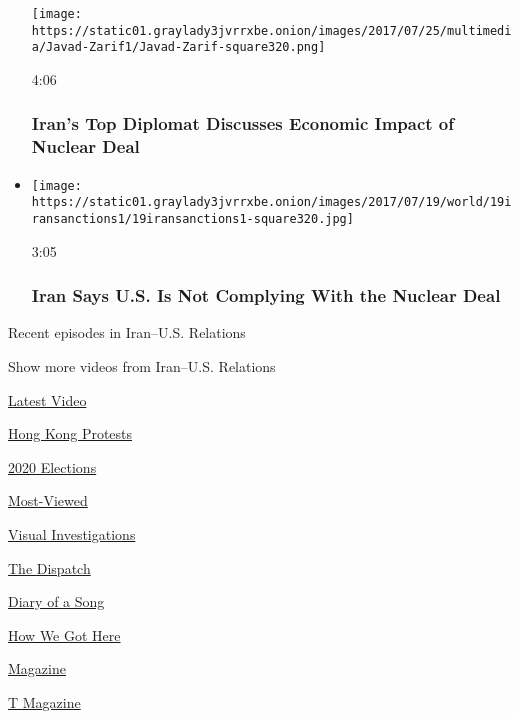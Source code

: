\begin{itemize}
  \texttt{[image: https://static01.graylady3jvrrxbe.onion/images/2017/07/25/multimedia/Javad-Zarif1/Javad-Zarif-square320.png]}

  4:06

  \hypertarget{irans-top-diplomat-discusses-economic-impact-of-nuclear-deal}{%
  \subsubsection{Iran's Top Diplomat Discusses Economic Impact of
  Nuclear
  Deal}\label{irans-top-diplomat-discusses-economic-impact-of-nuclear-deal}}
\item
  \href{https://www.nytimes3xbfgragh.onion/video/world/middleeast/100000005277964/us-iran-nuclear-deal-sanctions.html?action=click\&module=video-series-bar\&region=header\&pgtype=Article\&playlistId=video/us-iran-relations}{}

  \texttt{[image: https://static01.graylady3jvrrxbe.onion/images/2017/07/19/world/19iransanctions1/19iransanctions1-square320.jpg]}

  3:05

  \hypertarget{iran-says-us-is-not-complying-with-the-nuclear-deal}{%
  \subsubsection{Iran Says U.S. Is Not Complying With the Nuclear
  Deal}\label{iran-says-us-is-not-complying-with-the-nuclear-deal}}
\end{itemize}

Recent episodes in Iran--U.S. Relations

Show more videos from Iran--U.S. Relations

\href{/video}{}

\href{/video/latest-video}{Latest Video}

\href{/video/hk-protest}{Hong Kong Protests}

\href{/video/2020-Elections}{2020 Elections}

\href{/video/Most-Viewed}{Most-Viewed}

\href{/video/investigations}{Visual Investigations}

\href{/video/on-the-ground}{The Dispatch}

\href{/video/diaryofasong}{Diary of a Song}

\href{/video/how-we-got-here}{How We Got Here}

\href{/video/magazine}{Magazine}

\href{/video/t-magazine}{T Magazine}

